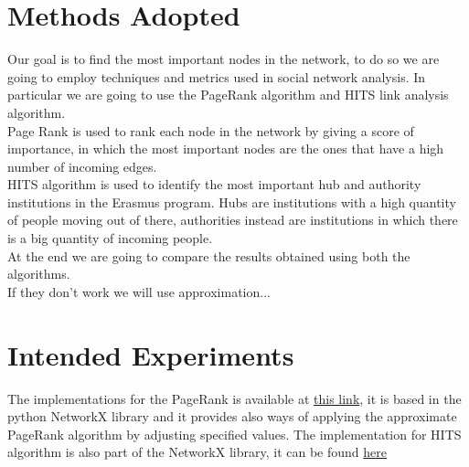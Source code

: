 \section{Methods Adopted}
    Our goal is to find the most important nodes in the network, to do so we are going to employ techniques and metrics used in social network analysis. 
    In particular we are going to use the PageRank algorithm and HITS link analysis algorithm.
    \\Page Rank is used to rank each node in the network by giving a score of importance, in which the most important nodes are the ones that have a high number of incoming edges.
    \\HITS algorithm is used to identify the most important hub and authority institutions in the Erasmus program. Hubs are institutions with a 
    high quantity of people moving out of there, authorities instead are institutions in which there is a big quantity of incoming people.
    \\
    At the end we are going to compare the results obtained using both the algorithms.
    \\If they don't work we will use approximation... 

\section{Intended Experiments}
    The implementations for the PageRank is available at \href{https://networkx.org/documentation/stable/reference/algorithms/generated/networkx.algorithms.link_analysis.pagerank_alg.pagerank.html}{\color{blue}this link}, 
    it is based in the python NetworkX library and it provides also ways of applying the approximate PageRank algorithm by adjusting specified values. 
    The implementation for HITS algorithm is also part of the NetworkX library, it can be found \href{https://networkx.org/documentation/stable/reference/algorithms/generated/networkx.algorithms.link_analysis.hits_alg.hits.html}{\color{blue}here}

